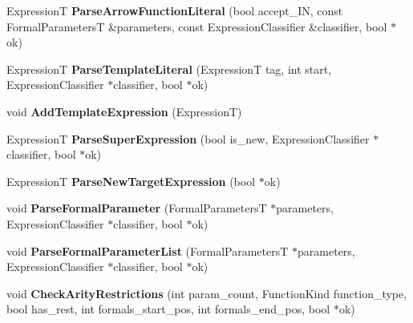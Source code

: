 \begin{DoxyCompactItemize}
\item 
ExpressionT {\bfseries Parse\+Arrow\+Function\+Literal} (bool accept\+\_\+\+IN, const Formal\+ParametersT \&parameters, const Expression\+Classifier \&classifier, bool $\ast$ok)\hypertarget{classv8_1_1internal_1_1_parser_base_afeb3c90fdb29f49b4e2d64acef31c699}{}\label{classv8_1_1internal_1_1_parser_base_afeb3c90fdb29f49b4e2d64acef31c699}

\item 
ExpressionT {\bfseries Parse\+Template\+Literal} (ExpressionT tag, int start, Expression\+Classifier $\ast$classifier, bool $\ast$ok)\hypertarget{classv8_1_1internal_1_1_parser_base_a038561e78fe7f4ab92d9b78898e6b274}{}\label{classv8_1_1internal_1_1_parser_base_a038561e78fe7f4ab92d9b78898e6b274}

\item 
void {\bfseries Add\+Template\+Expression} (ExpressionT)\hypertarget{classv8_1_1internal_1_1_parser_base_a6a7f2bc19951b2fd6aa8c6dc5d7754ff}{}\label{classv8_1_1internal_1_1_parser_base_a6a7f2bc19951b2fd6aa8c6dc5d7754ff}

\item 
ExpressionT {\bfseries Parse\+Super\+Expression} (bool is\+\_\+new, Expression\+Classifier $\ast$classifier, bool $\ast$ok)\hypertarget{classv8_1_1internal_1_1_parser_base_ab32af44fb2a9431448e5ab8277e405e7}{}\label{classv8_1_1internal_1_1_parser_base_ab32af44fb2a9431448e5ab8277e405e7}

\item 
ExpressionT {\bfseries Parse\+New\+Target\+Expression} (bool $\ast$ok)\hypertarget{classv8_1_1internal_1_1_parser_base_ae4562571a43774ee8b651acc141b8aac}{}\label{classv8_1_1internal_1_1_parser_base_ae4562571a43774ee8b651acc141b8aac}

\item 
void {\bfseries Parse\+Formal\+Parameter} (Formal\+ParametersT $\ast$parameters, Expression\+Classifier $\ast$classifier, bool $\ast$ok)\hypertarget{classv8_1_1internal_1_1_parser_base_a6e2ffc9ebdf6bd0f23bd2d3bfa22b738}{}\label{classv8_1_1internal_1_1_parser_base_a6e2ffc9ebdf6bd0f23bd2d3bfa22b738}

\item 
void {\bfseries Parse\+Formal\+Parameter\+List} (Formal\+ParametersT $\ast$parameters, Expression\+Classifier $\ast$classifier, bool $\ast$ok)\hypertarget{classv8_1_1internal_1_1_parser_base_a56141572fe01a4da83133f6f6cecf2b3}{}\label{classv8_1_1internal_1_1_parser_base_a56141572fe01a4da83133f6f6cecf2b3}

\item 
void {\bfseries Check\+Arity\+Restrictions} (int param\+\_\+count, Function\+Kind function\+\_\+type, bool has\+\_\+rest, int formals\+\_\+start\+\_\+pos, int formals\+\_\+end\+\_\+pos, bool $\ast$ok)\hypertarget{classv8_1_1internal_1_1_parser_base_a7b74ff175356048a834bcaf7e52411f6}{}\label{classv8_1_1internal_1_1_parser_base_a7b74ff175356048a834bcaf7e52411f6}


\end{DoxyCompactItemize}
